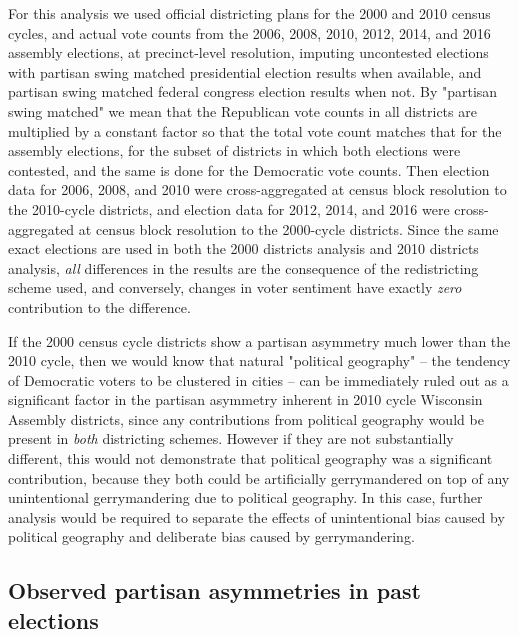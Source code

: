 \documentclass[preprint,12pt]{article}
\begin{document}
For this analysis we used official districting plans for the 2000 and 2010 census cycles, and actual vote counts from the 2006, 2008, 2010, 2012, 2014, and 2016 assembly elections, at precinct-level resolution, imputing uncontested elections with partisan swing matched presidential election results when available, and partisan swing matched federal congress election results when not.
By "partisan swing matched" we mean that the Republican vote counts in all districts are multiplied by a constant factor so that the total vote count matches that for the assembly elections, for the subset of districts in which both elections were contested, and the same is done for the Democratic vote counts.
Then election data for 2006, 2008, and 2010 were cross-aggregated at census block resolution to the 2010-cycle districts, and election data for 2012, 2014, and 2016 were cross-aggregated at census block resolution to the 2000-cycle districts. 
Since the same exact elections are used in both the 2000 districts analysis and 2010 districts analysis, \emph{all} differences in the results are the consequence of the redistricting scheme used, and conversely, changes in voter sentiment have exactly \emph{zero} contribution to the difference.

If the 2000 census cycle districts show a partisan asymmetry much lower than the 2010 cycle, then we would know that natural "political geography" -- the tendency of Democratic voters to be clustered in cities -- can be immediately ruled out as a significant factor in the partisan asymmetry inherent in 2010 cycle Wisconsin Assembly districts, since any contributions from political geography would be present in \emph{both} districting schemes.
However if they are not substantially different, this would not demonstrate that political geography was a significant contribution, because they both could be artificially gerrymandered on top of any unintentional gerrymandering due to political geography.
In this case, further analysis would be required to separate the effects of unintentional bias caused by political geography and deliberate bias caused by gerrymandering.

\subsection{Observed partisan asymmetries in past elections}
\end{document}
